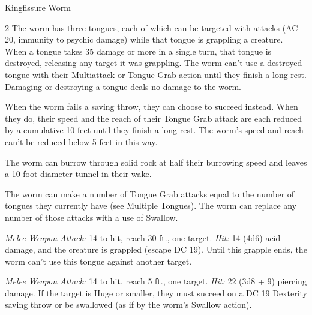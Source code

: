 \documentclass[10pt,a4paper,twoside,bg=print,twocolumn,openany,nodeprecatedcode]{dndbook}
\begin{document}
\begin{DndMonster}[float*=b,width=\textwidth + 8pt]{Kingfissure Worm}
\begin{multicols}{2}
\DndMonsterBasics[
armor-class = {16 (natural armor)},
hit-points = {\DndDice{18d20 + 108}},
speed = {60 ft., burrow 50 ft.}
]
\DndMonsterAbilityScores[
 str = 29,
 dex = 10,
 con = 23,
 int = 1,
 wis = 10,
 cha = 5
]
\DndMonsterDetails[
saving-throws = {Con +11},
condition-immunities = {charmed, flanked, frightened, prone},
senses = {blindsight 30 ft., tremorsense 120 ft., passive perception 10},
challenge = 15,
]
The worm has three tongues, each of which can be targeted with attacks (AC 20, immunity to psychic damage) while that tongue is grappling a creature. When a tongue takes 35 damage or more in a single turn, that tongue is destroyed, releasing any target it was grappling. The worm can't use a destroyed tongue with their Multiattack or Tongue Grab action until they finish a long rest. Damaging or destroying a tongue deals no damage to the worm.

When the worm fails a saving throw, they can choose to succeed instead. When they do, their speed and the reach of their Tongue Grab attack are each reduced by a cumulative 10 feet until they finish a long rest. The worm's speed and reach can't be reduced below 5 feet in this way.

The worm can burrow through solid rock at half their burrowing speed and leaves a 10-foot-diameter tunnel in their wake.

The worm can make a number of Tongue Grab attacks equal to the number of tongues they currently have (see Multiple Tongues). The worm can replace any number of those attacks with a use of Swallow.

\textsl{Melee Weapon Attack:} 14 to hit, reach 30 ft., one target. \textsl{Hit:} 14 (4d6) acid damage, and the creature is grappled (escape DC 19). Until this grapple ends, the worm can't use this tongue against another target.

\textsl{Melee Weapon Attack:} 14 to hit, reach 5 ft., one target. \textsl{Hit:} 22 (3d8 + 9) piercing damage. If the target is Huge or smaller, they must succeed on a DC 19 Dexterity saving throw or be swallowed (as if by the worm's Swallow action).


\end{multicols}
\end{DndMonster}
\end{document}
